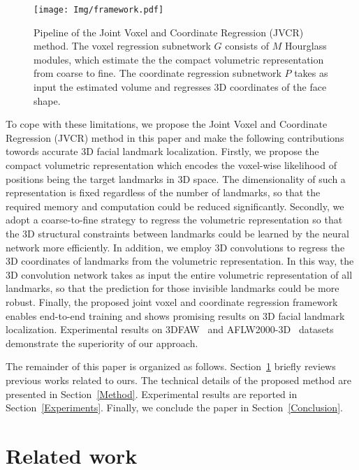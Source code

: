 \documentclass[a4paper,conference]{IEEEtran}
\begin{document}
\begin{figure*}[t]
	\begin{center}
		\texttt{[image: Img/framework.pdf]}
		\caption{Pipeline of the Joint Voxel and Coordinate Regression (JVCR) method. The voxel regression subnetwork $G$ consists of $M$ Hourglass modules, which estimate the the compact volumetric representation from coarse to fine. The coordinate regression subnetwork $P$ takes as input the estimated volume and regresses 3D coordinates of the face shape.
		}
		\label{fig:framework}
	\end{center}
\end{figure*}


To cope with these limitations, we propose the Joint Voxel and Coordinate Regression (JVCR) method in this paper and make the following contributions towords accurate 3D facial landmark localization.
Firstly, we propose the compact volumetric representation which encodes the voxel-wise likelihood of positions being the target landmarks in 3D space.
The dimensionality of such a representation is fixed regardless of the number of landmarks, so that the required memory and computation could be reduced significantly.
Secondly, we adopt a coarse-to-fine strategy to regress the volumetric representation so that the 3D structural constraints between landmarks could be learned by the neural network more efficiently.
In addition, we employ 3D convolutions to regress the 3D coordinates of landmarks from the volumetric representation.
In this way, the 3D convolution network takes as input the entire volumetric representation of all landmarks, so that the prediction for those invisible landmarks could be more robust.
Finally, the proposed joint voxel and coordinate regression framework enables end-to-end training and shows promising results on 3D facial landmark localization.
Experimental results on 3DFAW~\cite{jeni2016first} and AFLW2000-3D~\cite{zhu2016face} datasets demonstrate the superiority of our approach.

The remainder of this paper is organized as follows. Section~\ref{RelatedWork} briefly reviews previous works related to ours.
The technical details of the proposed method are presented in Section~\ref{Method}.
Experimental results are reported in Section~\ref{Experiments}.
Finally, we conclude the paper in Section~\ref{Conclusion}.



\section{Related work}
\label{RelatedWork}
\end{document}
